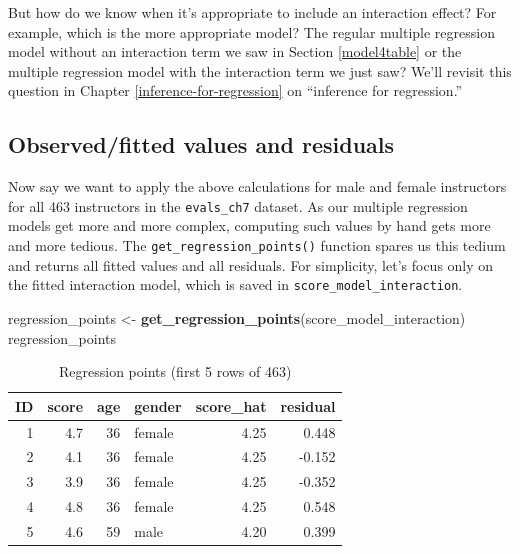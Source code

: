 \documentclass[12pt,]{krantz}
\makeatletter
\newenvironment{Shaded}{\begin{snugshade}}{\end{snugshade}}
\newcommand{\KeywordTok}[1]{\textcolor[rgb]{0.27,0.27,0.27}{\textbf{#1}}}
\newcommand{\StringTok}[1]{\textcolor[rgb]{0.5,0.5,0.5}{#1}}
\newcommand{\NormalTok}[1]{#1}
\newenvironment{kframe}{%
\medskip{}
\setlength{\fboxsep}{.8em}
 \def\at@end@of@kframe{}%
 \ifinner\ifhmode%
  \def\at@end@of@kframe{\end{minipage}}%
  \begin{minipage}{\columnwidth}%
 \fi\fi%
 \def\FrameCommand##1{\hskip\@totalleftmargin \hskip-\fboxsep
 \colorbox{shadecolor}{##1}\hskip-\fboxsep
     \hskip-\linewidth \hskip-\@totalleftmargin \hskip\columnwidth}%
 \MakeFramed {\advance\hsize-\width
   \@totalleftmargin\z@ \linewidth\hsize
   \@setminipage}}%
 {\par\unskip\endMakeFramed%
 \at@end@of@kframe}
\renewenvironment{Shaded}{\begin{kframe}}{\end{kframe}}
\theoremstyle{definition}
\theoremstyle{definition}
\theoremstyle{definition}
\theoremstyle{remark}
\makeatother
\begin{document}
But how do we know when it's appropriate to include an interaction
effect? For example, which is the more appropriate model? The regular
multiple regression model without an interaction term we saw in Section
\ref{model4table} or the multiple regression model with the interaction
term we just saw? We'll revisit this question in Chapter
\ref{inference-for-regression} on ``inference for regression.''

\subsection{Observed/fitted values and residuals}\label{model4points}

Now say we want to apply the above calculations for male and female
instructors for all 463 instructors in the \texttt{evals\_ch7} dataset.
As our multiple regression models get more and more complex, computing
such values by hand gets more and more tedious. The
\texttt{get\_regression\_points()} function spares us this tedium and
returns all fitted values and all residuals. For simplicity, let's focus
only on the fitted interaction model, which is saved in
\texttt{score\_model\_interaction}.

\begin{Shaded}
\begin{Highlighting}[]
\NormalTok{regression_points <-}\StringTok{ }\KeywordTok{get_regression_points}\NormalTok{(score_model_interaction)}
\NormalTok{regression_points}
\end{Highlighting}
\end{Shaded}

\begin{table}[H]

\caption{\label{tab:model4-points-table}Regression points (first 5 rows of 463)}
\centering
\fontsize{10}{12}\selectfont
\begin{tabular}[t]{rrrlrr}
\toprule
ID & score & age & gender & score\_hat & residual\\
\midrule
1 & 4.7 & 36 & female & 4.25 & 0.448\\
2 & 4.1 & 36 & female & 4.25 & -0.152\\
3 & 3.9 & 36 & female & 4.25 & -0.352\\
4 & 4.8 & 36 & female & 4.25 & 0.548\\
5 & 4.6 & 59 & male & 4.20 & 0.399\\
\bottomrule
\end{tabular}
\end{table}
\end{document}
